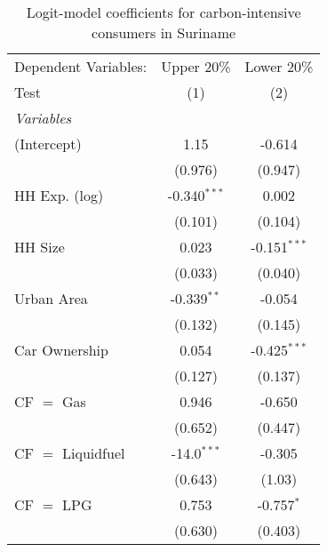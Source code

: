 
\begin{table}[htbp!]
   \centering
   \small
   \begin{adjustbox}{width = 1\textwidth, max height = 0.95\textheight, center}
      \begin{threeparttable}[b]
         \caption{\label{tab:Logit_1_SUR} Logit-model coefficients for carbon-intensive consumers in Suriname}
         \begin{tabular}{lcc}
            \tabularnewline \midrule \midrule
            Dependent Variables:          & Upper 20\%     & Lower 20\%\\   
            Test                          & (1)            & (2)\\  
            \midrule
            \emph{Variables}\\
            (Intercept)                   & 1.15           & -0.614\\   
                                          & (0.976)        & (0.947)\\   
            HH Exp. (log)                 & -0.340$^{***}$ & 0.002\\   
                                          & (0.101)        & (0.104)\\   
            HH Size                       & 0.023          & -0.151$^{***}$\\   
                                          & (0.033)        & (0.040)\\   
            Urban Area                    & -0.339$^{**}$  & -0.054\\   
                                          & (0.132)        & (0.145)\\   
            Car Ownership                 & 0.054          & -0.425$^{***}$\\   
                                          & (0.127)        & (0.137)\\   
            CF $=$ Gas                    & 0.946          & -0.650\\   
                                          & (0.652)        & (0.447)\\   
            CF $=$ Liquidfuel             & -14.0$^{***}$  & -0.305\\   
                                          & (0.643)        & (1.03)\\   
            CF $=$ LPG                    & 0.753          & -0.757$^{*}$\\   
                                          & (0.630)        & (0.403)\\   

\end{tabular}
\end{threeparttable}
\end{adjustbox}
\end{table}
